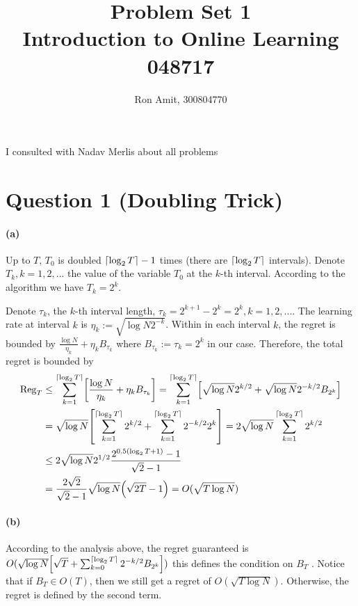 \documentclass{article}
\title{Problem Set 1 \\ Introduction to Online Learning 048717}
\author{Ron Amit, 300804770 }
\DeclarePairedDelimiter\br{(}{)}%
\DeclarePairedDelimiter\brs{[}{]}%
\DeclarePairedDelimiter\ceil{\lceil}{\rceil}%
\newcommand{\Reg}{\text{Reg}}
\begin{document}
\maketitle
I consulted with Nadav Merlis about all problems
\section{Question 1 (Doubling Trick)}

\paragraph{(a)}
Up to $T$,  $T_0$ is doubled $\ceil{\log_2 T}-1$ times (there are $\ceil{\log_2 T}$ intervals).
Denote $T_k, k=1,2,...$ the value of the variable $T_0$ at the $k$-th interval. According to the algorithm we have $T_k = 2^k$.

Denote $\tau_k$, the  $k$-th interval length, $\tau_k = 2^{k+1}-2^{k} = 2^{k}, k=1,2,...$.
The learning rate at interval $k$ is $\eta_k := \sqrt{\log N 2^{-k}}$.
Within in each interval $k$, the regret is bounded by $\frac{\log N}{\eta_k} + \eta_k B_{\tau_k}$
where $ B_{\tau_k} := \tau_k = 2^k$ in our case.
Therefore, the total regret is bounded by
\begin{align*}
\Reg_T &\leq \sum_{k=1}^{\ceil{\log_2 T}} \brs*{ \frac{\log N}{\eta_k} + \eta_k B_{\tau_k} }
            = \sum_{k=1}^{\ceil{\log_2 T}} \brs*{\sqrt{\log N}  2^{k/2} +  \sqrt{\log N}  2^{-k/2} B_{2^k}} \\
    &=  \sqrt{\log N} \brs*{ \sum_{k=1}^{\ceil{\log_2 T}} 2^{k/2}  + \sum_{k=1}^{\ceil{\log_2 T}} 2^{-k/2}2^k} = 2 \sqrt{\log N}  \sum_{k=1}^{\ceil{\log_2 T}} 2^{k/2}\\
    &  \leq   2 \sqrt{\log N} 2^{1/2} \frac{2^{0.5 (\log_2 T + 1)}-1}{\sqrt{2}-1}  \\
    & =\frac{2\sqrt{2}}{\sqrt{2}-1} \sqrt{\log N} \br*{\sqrt{2T}-1}  = O (\sqrt{T \log N })
\end{align*}

\paragraph{(b)}
According to the analysis above, the regret guaranteed is 
$O(\sqrt{\log N } \brs*{\sqrt{T} +  \sum_{k=0}^{\ceil{\log_2 T}} 2^{-k/2} B_{2^k}})$
this defines the condition on $B_T$ .
Notice that if  $B_T \in O(T)$, then we still get a regret of $ O (\sqrt{T \log N })$.
Otherwise, the regret is defined by the second term.
\end{document}
